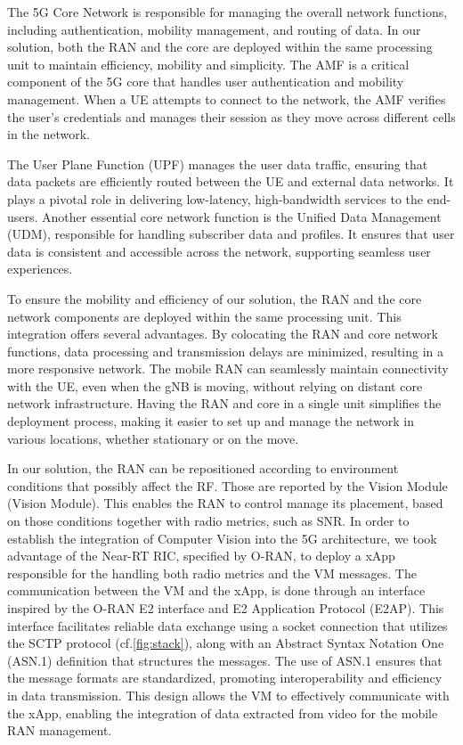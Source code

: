 The 5G Core Network is responsible for managing the overall network functions, including authentication, mobility management, and routing of data.
In our solution, both the RAN and the core are deployed within the same processing unit to maintain efficiency, mobility and simplicity.
The AMF is a critical component of the 5G core that handles user authentication and mobility management. When a UE attempts to connect to the network, the AMF verifies the user's credentials and manages their session as they move across different cells in the network.

The User Plane Function (UPF) manages the user data traffic, ensuring that data packets are efficiently routed between the UE and external data networks. It plays a pivotal role in delivering low-latency, high-bandwidth services to the end-users. Another essential core network function is the Unified Data Management (UDM), responsible for handling subscriber data and profiles. It ensures that user data is consistent and accessible across the network, supporting seamless user experiences.

To ensure the mobility and efficiency of our solution, the RAN and the core network components are deployed within the same processing unit.
This integration offers several advantages. By colocating the RAN and core network functions, data processing and transmission delays are minimized, resulting in a more responsive network. The mobile RAN can seamlessly maintain connectivity with the UE, even when the gNB is moving, without relying on distant core network infrastructure. Having the RAN and core in a single unit simplifies the deployment process, making it easier to set up and manage the network in various locations, whether stationary or on the move.

In our solution, the RAN can be repositioned according to environment conditions that possibly affect the RF\@.
Those are reported by the Vision Module (Vision Module).
This enables the RAN to control manage its placement, based on those conditions together with radio metrics, such as SNR\@.
In order to establish the integration of Computer Vision into the 5G architecture, we took advantage of the Near-RT RIC, specified by O-RAN, to deploy a xApp responsible for the handling both radio metrics and the VM messages.
The communication between the VM and the xApp, is done through an interface inspired by the O-RAN E2 interface and E2 Application Protocol (E2AP).
This interface facilitates reliable data exchange using a socket connection that utilizes the SCTP protocol (cf.\ref{fig:stack}), along with an Abstract Syntax Notation One (ASN.1) definition that structures the messages.
The use of ASN.1 ensures that the message formats are standardized, promoting interoperability and efficiency in data transmission.
This design allows the VM to effectively communicate with the xApp, enabling the integration of data extracted from video for the mobile RAN management.

